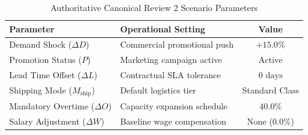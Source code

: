 \begin{table}[htbp]
\caption{Authoritative Canonical Review 2 Scenario Parameters}
\begin{center}
\begin{tabular}{llc}
\toprule
\textbf{Parameter} & \textbf{Operational Setting} & \textbf{Value} \\
\midrule
Demand Shock ($\Delta D$) & Commercial promotional push & $+15.0\%$ \\
Promotion Status ($P$) & Marketing campaign active & Active \\
Lead Time Offset ($\Delta L$) & Contractual SLA tolerance & $0\text{ days}$ \\
Shipping Mode ($M_{\text{ship}}$) & Default logistics tier & Standard Class \\
Mandatory Overtime ($\Delta O$) & Capacity expansion schedule & $40.0\%$ \\
Salary Adjustment ($\Delta W$) & Baseline wage compensation & None ($0.0\%$) \\
\bottomrule
\end{tabular}
\label{tab:canonical_scenario}
\end{center}
\end{table}
